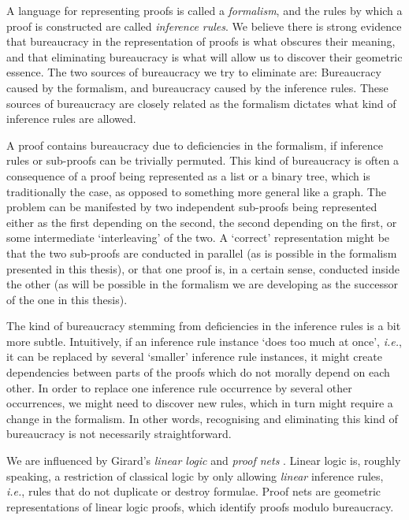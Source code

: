A language for representing proofs is called a \emph{formalism}, and the rules by which a proof is constructed are called \emph{inference rules}. We believe there is strong evidence that bureaucracy in the representation of proofs is what obscures their meaning, and that eliminating bureaucracy is what will allow us to discover their geometric essence. The two sources of bureaucracy we try to eliminate are: Bureaucracy caused by the formalism, and bureaucracy caused by the inference rules. These sources of bureaucracy are closely related as the formalism dictates what kind of inference rules are allowed.

A proof contains bureaucracy due to deficiencies in the formalism, if inference rules or sub-proofs can be trivially permuted. This kind of bureaucracy is often a consequence of a proof being represented as a list or a binary tree, which is traditionally the case, as opposed to something more general like a graph. The problem can be manifested by two independent sub-proofs being represented either as the first depending on the second, the second depending on the first, or some intermediate `interleaving' of the two. A `correct' representation might be that the two sub-proofs are conducted in parallel (as is possible in the formalism presented in this thesis), or that one proof is, in a certain sense, conducted inside the other (as will be possible in the formalism we are developing as the successor of the one in this thesis).

The kind of bureaucracy stemming from deficiencies in the inference rules is a bit more subtle. Intuitively, if an inference rule instance `does too much at once', \emph{i.e.}, it can be replaced by several `smaller' inference rule instances, it might create dependencies between parts of the proofs which do not morally depend on each other. In order to replace one inference rule occurrence by several other occurrences, we might need to discover new rules, which in turn might require a change in the formalism. In other words, recognising and eliminating this kind of bureaucracy is not necessarily straightforward.


We are influenced by Girard's \emph{linear logic} and \emph{proof nets} \cite{Gira:87:Linear-L:wm}. Linear logic is, roughly speaking, a restriction of classical logic by only allowing \emph{linear} inference rules, \emph{i.e.}, rules that do not duplicate or destroy formulae. Proof nets are geometric representations of linear logic proofs, which identify proofs modulo bureaucracy.

